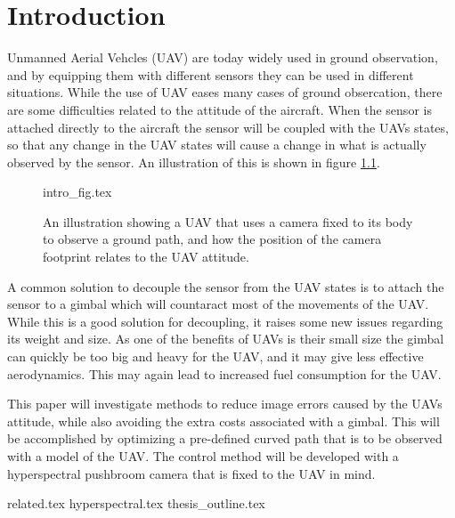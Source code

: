 \chapter{Introduction}

Unmanned Aerial Vehcles (UAV) are today widely used in ground observation, and by equipping them with different sensors they can be used in different situations. While the use of UAV eases many cases of ground obsercation, there are some difficulties related to the attitude of the aircraft. When the sensor is attached directly to the aircraft the sensor will be coupled with the UAVs states, so that any change in the UAV states will cause a change in what is actually observed by the sensor. An illustration of this is shown in figure \ref{fig:intro_fig}.

\begin{figure}
	{intro_fig.tex}
	\caption{An illustration showing a UAV that uses a camera fixed to its body to observe a ground path, and how the position of the camera footprint relates to the UAV attitude.}
	\label{fig:intro_fig}
\end{figure}

A common solution to decouple the sensor from the UAV states is to attach the sensor to a gimbal which will countaract most of the movements of the UAV. While this is a good solution for decoupling, it raises some new issues regarding its weight and size. As one of the benefits of UAVs is their small size the gimbal can quickly be too big and heavy for the UAV, and it may give less effective aerodynamics. This may again lead to increased fuel consumption for the UAV.

This paper will investigate methods to reduce image errors caused by the UAVs attitude, while also avoiding the extra costs associated with a gimbal. This will be accomplished by optimizing a pre-defined curved path that is to be observed with a model of the UAV. The control method will be developed with a hyperspectral pushbroom camera that is fixed to the UAV in mind.


{related.tex}
{hyperspectral.tex}
{thesis_outline.tex}